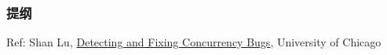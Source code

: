 % 
% 
% 
% 
\begin{frame}
\frametitle{提纲} %
\tableofcontents %

Ref: Shan Lu, \href{https://s4plus.ustc.edu.cn/_upload/article/files/84/48/964812c049829f4538793b862187/430bcb14-7aa7-4689-b340-9c81e735e5eb.pdf}{Detecting and Fixing Concurrency Bugs}, University of Chicago

\end{frame}

